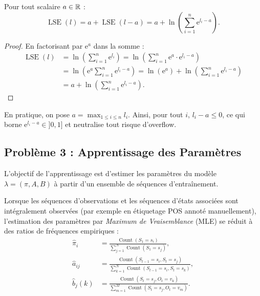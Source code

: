 \begin{proposition}
    Pour tout scalaire $a \in \mathbb{R}$ :
    \begin{equation}
        \operatorname{LSE}(l) = a + \operatorname{LSE}(l - a) = a + \ln \left( \sum_{i=1}^n \mathrm{e}^{l_i - a} \right).
    \end{equation}
\end{proposition}

\begin{proof}
    En factorisant par $\mathrm{e}^a$ dans la somme :
    \begin{align}
        \operatorname{LSE}(l) &= \ln \left( \sum_{i=1}^n \mathrm{e}^{l_i} \right) = \ln \left( \sum_{i=1}^n \mathrm{e}^a \cdot \mathrm{e}^{l_i - a} \right) \nonumber \\
        &= \ln \left( \mathrm{e}^a \sum_{i=1}^n \mathrm{e}^{l_i - a} \right) = \ln(\mathrm{e}^a) + \ln \left( \sum_{i=1}^n \mathrm{e}^{l_i - a} \right) \nonumber \\
        &= a + \ln \left( \sum_{i=1}^n \mathrm{e}^{l_i - a} \right).
    \end{align}
\end{proof}

En pratique, on pose $a = \max_{1 \le i \le n} l_i$. Ainsi, pour tout $i$, $l_i - a \le 0$, ce qui borne $\mathrm{e}^{l_i - a} \in ]0, 1]$ et neutralise tout risque d'overflow.

\subsection{Problème 3 : Apprentissage des Paramètres}

L'objectif de l'apprentissage est d'estimer les paramètres du modèle $\lambda = (\pi, A, B)$ à partir d'un ensemble de séquences d'entraînement.

\begin{proposition}
    Lorsque les séquences d'observations et les séquences d'états associées sont intégralement observées (par exemple en étiquetage POS annoté manuellement), l'estimation des paramètres par \emph{Maximum de Vraisemblance} (MLE) se réduit à des ratios de fréquences empiriques :
    \begin{align}
        \hat{\pi}_i &= \frac{\operatorname{Count}(S_1 = s_i)}{\sum_{j=1}^N \operatorname{Count}(S_1 = s_j)}, \\
        \hat{a}_{ij} &= \frac{\operatorname{Count}(S_{t-1} = s_i, S_t = s_j)}{\sum_{k=1}^N \operatorname{Count}(S_{t-1} = s_i, S_t = s_k)}, \\
        \hat{b}_j(k) &= \frac{\operatorname{Count}(S_t = s_j, O_t = v_k)}{\sum_{m=1}^M \operatorname{Count}(S_t = s_j, O_t = v_m)}.
    \end{align}
\end{proposition}

